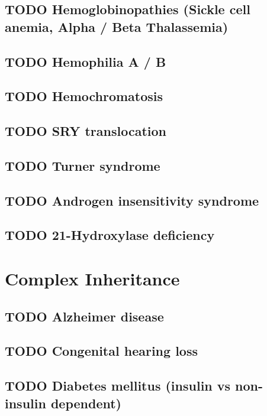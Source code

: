 \documentclass{scrartcl}
\begin{document}
\subsection{{\bfseries\sffamily TODO} Hemoglobinopathies (Sickle cell anemia, Alpha / Beta Thalassemia)}
\label{sec:org1ba5652}
\subsection{{\bfseries\sffamily TODO} Hemophilia A / B}
\label{sec:org1b97765}
\subsection{{\bfseries\sffamily TODO} Hemochromatosis}
\label{sec:org40ec1ad}
\subsection{{\bfseries\sffamily TODO} SRY translocation}
\label{sec:orga24a6a3}
\subsection{{\bfseries\sffamily TODO} Turner syndrome}
\label{sec:org9a9a811}
\subsection{{\bfseries\sffamily TODO} Androgen insensitivity syndrome}
\label{sec:orgb1de541}
\subsection{{\bfseries\sffamily TODO} 21-Hydroxylase deficiency}
\label{sec:org8715378}

\section{Complex Inheritance}
\label{sec:org7ab568b}
\subsection{{\bfseries\sffamily TODO} Alzheimer disease}
\label{sec:org611a7ec}
\subsection{{\bfseries\sffamily TODO} Congenital hearing loss}
\label{sec:orgdcf5e4f}
\subsection{{\bfseries\sffamily TODO} Diabetes mellitus (insulin vs non-insulin dependent)}
\label{sec:orgbca7914}
\end{document}
